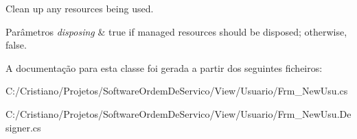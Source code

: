 Clean up any resources being used. 


\begin{DoxyParams}{Parâmetros}
{\em disposing} & true if managed resources should be disposed; otherwise, false.\\
\hline
\end{DoxyParams}


A documentação para esta classe foi gerada a partir dos seguintes ficheiros\+:\begin{DoxyCompactItemize}
\item 
C\+:/\+Cristiano/\+Projetos/\+Software\+Ordem\+De\+Servico/\+View/\+Usuario/Frm\+\_\+\+New\+Usu.\+cs\item 
C\+:/\+Cristiano/\+Projetos/\+Software\+Ordem\+De\+Servico/\+View/\+Usuario/Frm\+\_\+\+New\+Usu.\+Designer.\+cs\end{DoxyCompactItemize}
